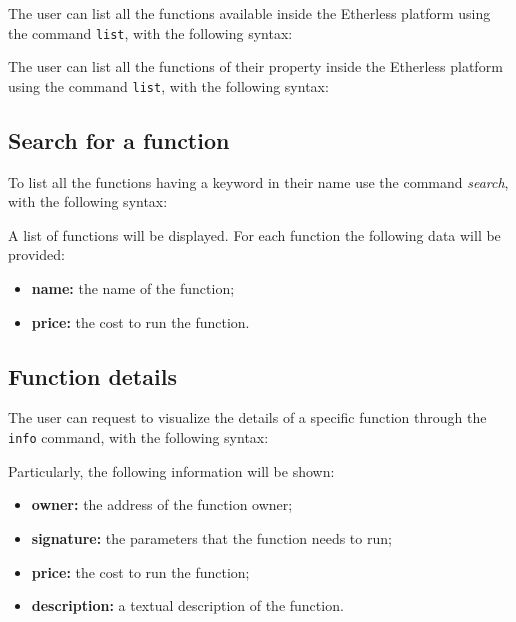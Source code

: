 The user can list all the functions available inside the Etherless platform using the command \texttt{list}, with the following syntax:
\begin{center}
\end{center}
The user can list all the functions of their property inside the Etherless platform using the command \texttt{list}, with the following syntax:
\begin{center}
\end{center}

\subsection{Search for a function}
To list all the functions having a keyword in their name use the command \textit{search}, with the following syntax:
\begin{center}
\end{center}

A list of functions will be displayed. For each function the following data will be provided:
\begin{itemize}
	\item \textbf{name: } the name of the function;
	\item \textbf{price: } the cost to run the function.
\end{itemize}

\subsection{Function details}
The user can request to visualize the details of a specific function through the \texttt{info} command, with the following syntax: \\
\begin{center}
\end{center}
Particularly, the following information will be shown:
\begin{itemize}
	\item \textbf{owner: } the address of the function owner;
	\item \textbf{signature: } the parameters that the function needs to run;
	\item \textbf{price: } the cost to run the function;
	\item \textbf{description: } a textual description of the function.
\end{itemize}

